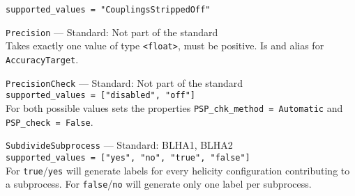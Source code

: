 \begin{basedescript}{\desclabelstyle{\pushlabel}}
        \lstinline[style=in]|supported_values = "CouplingsStrippedOff"|
    \item[\hspace{-1em}]\colorbox{gray!30}{\lstinline[style=in]|Precision|} --- Standard: Not part of the standard\vspace{0.1cm}\\
        Takes exactly one value of type \texttt{<float>}, must be positive. Is and alias for \texttt{AccuracyTarget}.
    \item[\hspace{-1em}]\colorbox{gray!30}{\lstinline[style=in]|PrecisionCheck|} --- Standard: Not part of the standard\vspace{0.1cm}\\
        \lstinline[style=in]|supported_values = ["disabled", "off"]|\\
        For both possible values sets the properties \lstinline[style=in]|PSP_chk_method = Automatic| and  \lstinline[style=in]|PSP_check = False|.
    \item[\hspace{-1em}]\colorbox{gray!30}{\lstinline[style=in]|SubdivideSubprocess|} --- Standard: BLHA1, BLHA2\vspace{0.1cm}\\
        \lstinline[style=in]|supported_values = ["yes", "no", "true", "false"]|\\
        For \texttt{true}/\texttt{yes} \gosam will generate labels for every helicity configuration contributing to a subprocess. For \texttt{false}/\texttt{no} \gosam will generate only one label per subprocess.
\end{basedescript}

